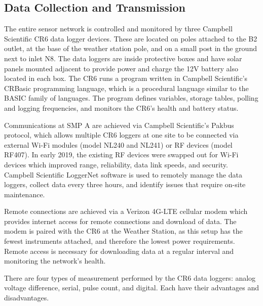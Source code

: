 \subsection{Data Collection and Transmission}

The entire sensor network is controlled and monitored by three Campbell Scientific CR6 data logger devices.
These are located on poles attached to the B2 outlet, at the base of the weather station pole, and on a small post in the ground next to inlet N8.
The data loggers are inside protective boxes and have solar panels mounted adjacent to provide power and charge the 12V battery also located in each box.
The CR6 runs a program written in Campbell Scientific's CRBasic programming language, which is a procedural language similar to the BASIC family of languages.
The program defines variables, storage tables, polling and logging frequencies, and monitors the CR6's health and battery status.

Communications at SMP A are achieved via Campbell Scientific's Pakbus protocol, which allows multiple CR6 loggers at one site to be connected via external Wi-Fi modules (model NL240 and NL241) or RF devices (model RF407).
In early 2019, the existing RF devices were swapped out for Wi-Fi devices which improved range, reliability, data link speeds, and security.
Campbell Scientific LoggerNet software is used to remotely manage the data loggers, collect data every three hours, and identify issues that require on-site maintenance.

Remote connections are achieved via a Verizon 4G-LTE cellular modem which provides internet access for remote connections and download of data.
The modem is paired with the CR6 at the Weather Station, as this setup has the fewest instruments attached, and therefore the lowest power requirements.
Remote access is necessary for downloading data at a regular interval and monitoring the network's health.

There are four types of measurement performed by the CR6 data loggers: analog voltage difference, serial, pulse count, and digital.
Each have their advantages and disadvantages.

